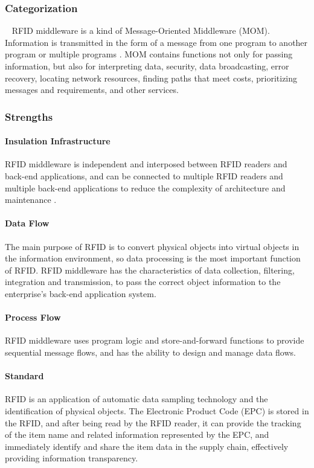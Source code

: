 \documentclass[conference]{IEEEtran}
\begin{document}
\subsubsection{Categorization}
\
\newline
\indent
RFID middleware is a kind of Message-Oriented Middleware (MOM). Information is transmitted in the form of a message from one program to another program or multiple programs \cite{b9}. MOM contains functions not only for passing information, but also for interpreting data, security, data broadcasting, error recovery, locating network resources, finding paths that meet costs, prioritizing messages and requirements, and other services.

\subsubsection{Strengths}

\paragraph{Insulation Infrastructure}
RFID middleware is independent and interposed between RFID readers and back-end applications, and can be connected to multiple RFID readers and multiple back-end applications to reduce the complexity of architecture and maintenance \cite{b10}.

\paragraph{Data Flow}
The main purpose of RFID is to convert physical objects into virtual objects in the information environment, so data processing is the most important function of RFID. RFID middleware has the characteristics of data collection, filtering, integration and transmission, to pass the correct object information to the enterprise's back-end application system.

\paragraph{Process Flow}
RFID middleware uses program logic and store-and-forward functions to provide sequential message flows, and has the ability to design and manage data flows.

\paragraph{Standard}
RFID is an application of automatic data sampling technology and the identification of physical objects. The Electronic Product Code (EPC) is stored in the RFID, and after being read by the RFID reader, it can provide the tracking of the item name and related information represented by the EPC, and immediately identify and share the item data in the supply chain, effectively providing information transparency.
\end{document}
